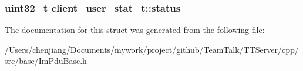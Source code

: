 \subsubsection[{status}]{\setlength{\rightskip}{0pt plus 5cm}uint32\+\_\+t client\+\_\+user\+\_\+stat\+\_\+t\+::status}\label{structclient__user__stat__t_a3e50c94161765b08270594d2f1338557}


The documentation for this struct was generated from the following file\+:\begin{DoxyCompactItemize}
\item 
/\+Users/chenjiang/\+Documents/mywork/project/github/\+Team\+Talk/\+T\+T\+Server/cpp/src/base/\hyperlink{_im_pdu_base_8h}{Im\+Pdu\+Base.\+h}\end{DoxyCompactItemize}
